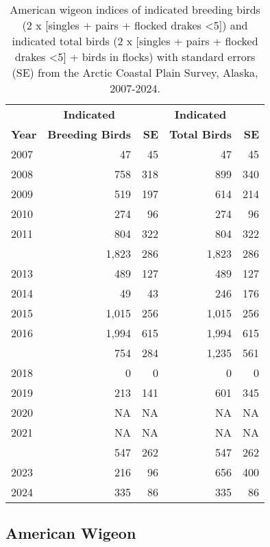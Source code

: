 \documentclass[
]{article}
\begin{document}
\begin{longtable}[t]{lrrrr}

\caption{\label{tbl-AMWI}American wigeon indices of indicated breeding
birds (2 x {[}singles + pairs + flocked drakes \textless5{]}) and
indicated total birds (2 x {[}singles + pairs + flocked drakes
\textless5{]} + birds in flocks) with standard errors (SE) from the
Arctic Coastal Plain Survey, Alaska, 2007-2024.}

\tabularnewline

\\
\toprule
\multicolumn{1}{c}{\textbf{ }} & \multicolumn{1}{c}{\textbf{Indicated}} & \multicolumn{1}{c}{\textbf{ }} & \multicolumn{1}{c}{\textbf{Indicated}} & \multicolumn{1}{c}{\textbf{ }} \\
\cmidrule(l{3pt}r{3pt}){2-2} \cmidrule(l{3pt}r{3pt}){4-4}
\textbf{Year} & \textbf{Breeding Birds} & \textbf{SE} & \textbf{Total Birds} & \textbf{SE}\\
\midrule
2007 & 47 & 45 & 47 & 45\\
2008 & 758 & 318 & 899 & 340\\
2009 & 519 & 197 & 614 & 214\\
2010 & 274 & 96 & 274 & 96\\
2011 & 804 & 322 & 804 & 322\\
\addlinespace
2012 & 1,823 & 286 & 1,823 & 286\\
2013 & 489 & 127 & 489 & 127\\
2014 & 49 & 43 & 246 & 176\\
2015 & 1,015 & 256 & 1,015 & 256\\
2016 & 1,994 & 615 & 1,994 & 615\\
\addlinespace
2017 & 754 & 284 & 1,235 & 561\\
2018 & 0 & 0 & 0 & 0\\
2019 & 213 & 141 & 601 & 345\\
2020 & NA & NA & NA & NA\\
2021 & NA & NA & NA & NA\\
\addlinespace
2022 & 547 & 262 & 547 & 262\\
2023 & 216 & 96 & 656 & 400\\
2024 & 335 & 86 & 335 & 86\\
\bottomrule

\end{longtable}

\endgroup{}

\newpage{}

\subsection*{American Wigeon}\label{american-wigeon-2}
\end{document}
